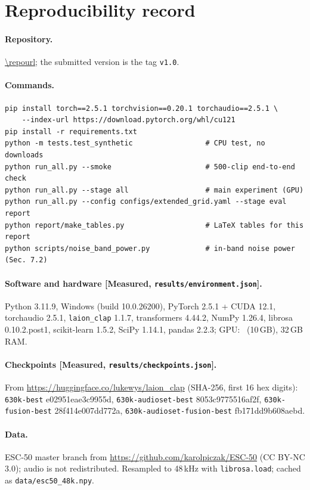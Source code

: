 \section{Reproducibility record}
\label{app:repro}

\paragraph{Repository.} \url{\repourl}; the submitted version is the tag \texttt{v1.0}.

\paragraph{Commands.}
\begin{verbatim}
pip install torch==2.5.1 torchvision==0.20.1 torchaudio==2.5.1 \
    --index-url https://download.pytorch.org/whl/cu121
pip install -r requirements.txt
python -m tests.test_synthetic                 # CPU test, no downloads
python run_all.py --smoke                      # 500-clip end-to-end check
python run_all.py --stage all                  # main experiment (GPU)
python run_all.py --config configs/extended_grid.yaml --stage eval report
python report/make_tables.py                   # LaTeX tables for this report
python scripts/noise_band_power.py             # in-band noise power (Sec. 7.2)
\end{verbatim}

\paragraph{Software and hardware [Measured, \texttt{results/environment.json}].}
Python 3.11.9, Windows (build 10.0.26200), PyTorch 2.5.1 + CUDA 12.1, torchaudio 2.5.1, \texttt{laion\_clap} 1.1.7, transformers 4.44.2, NumPy 1.26.4, librosa 0.10.2.post1,
scikit-learn 1.5.2, SciPy 1.14.1, pandas 2.2.3; GPU: \encgpu\ (10\,GB), 32\,GB RAM.

\paragraph{Checkpoints [Measured, \texttt{results/checkpoints.json}].}
From \url{https://huggingface.co/lukewys/laion_clap} (SHA-256, first 16 hex digits):
\texttt{630k-best} e02951eae3c9955d, \texttt{630k-audioset-best} 8053c9775516af2f,
\texttt{630k-fusion-best} 28f414e007dd772a, \texttt{630k-audioset-fusion-best} fb171dd9b608aebd.

\paragraph{Data.} ESC-50 master branch from \url{https://github.com/karolpiczak/ESC-50} (CC BY-NC 3.0); audio is not redistributed. Resampled to 48\,kHz with \texttt{librosa.load}; cached as \texttt{data/esc50\_48k.npy}.

